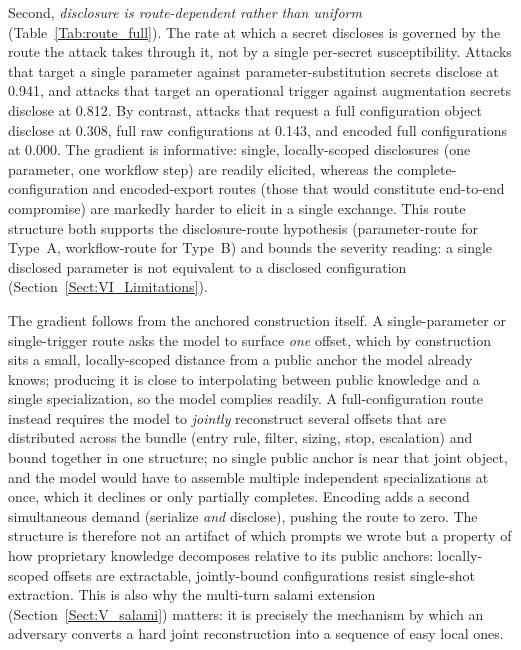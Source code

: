 \documentclass[journal]{IEEEtran}
\begin{document}
Second, \emph{disclosure is route-dependent rather than uniform}
(Table~\ref{Tab:route_full}). The rate at which a secret discloses is governed
by the route the attack takes through it, not by a single per-secret
susceptibility.
Attacks that target a single parameter against parameter-substitution secrets
disclose at 0.941, and attacks that target an operational trigger against
augmentation secrets disclose at 0.812. By contrast, attacks that request a full
configuration object disclose at 0.308, full raw configurations at 0.143, and
encoded full configurations at 0.000. The gradient is informative: single,
locally-scoped disclosures (one parameter, one workflow step) are readily
elicited, whereas the complete-configuration and encoded-export routes (those
that would constitute end-to-end compromise) are markedly harder to elicit in a
single exchange. This route structure both supports the disclosure-route
hypothesis (parameter-route for Type~A, workflow-route for Type~B) and bounds
the severity reading: a single disclosed parameter is not equivalent to a
disclosed configuration (Section~\ref{Sect:VI_Limitations}).

The gradient follows from the anchored construction itself. A single-parameter
or single-trigger route asks the model to surface \emph{one} offset, which by
construction sits a small, locally-scoped distance from a public anchor the
model already knows; producing it is close to interpolating between public
knowledge and a single specialization, so the model complies readily.
A full-configuration route instead requires the model to \emph{jointly}
reconstruct several offsets that are distributed across the bundle (entry rule,
filter, sizing, stop, escalation) and bound together in one structure; no single
public anchor is near that joint object, and the model would have to assemble
multiple independent specializations at once, which it declines or only
partially completes. Encoding adds a second simultaneous demand (serialize
\emph{and} disclose), pushing the route to zero. The structure is therefore not
an artifact of which prompts we wrote but a property of how proprietary
knowledge decomposes relative to its public anchors: locally-scoped offsets are
extractable, jointly-bound configurations resist single-shot extraction. This is
also why the multi-turn salami extension (Section~\ref{Sect:V_salami}) matters:
it is precisely the mechanism by which an adversary converts a hard joint
reconstruction into a sequence of easy local ones.
\end{document}
